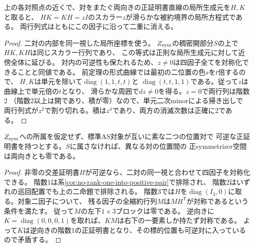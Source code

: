 \begin{corollary}[二対二境界の局所方程式]\label{cor:two-pair-transverse-coordinate}
上の各対照点の近くで、対をまたぐ両向きの正証明書直線の局所生成元を$H,K$と取ると、
$HK=KH=zI$のスカラー$z$が滑らかな被約境界の局所方程式である。
両行列式はともにこの因子に沿って二重に消える。
\end{corollary}
\begin{proof}
二対の内部を同一視した局所座標を使う。
$Z_{\rm sym}$の稠密開部分$S$の上で$HK,KH$は同じスカラー行列であり、
この等式は正則な局所生成元に対して近傍全体に延びる。
対内の可逆性も保たれるため、$z\ne0$は四因子全てを対称化できることと同値である。
前定理の形式曲線では最初の二位置の色$s$を$t$倍するので、
$H,K$は単元を除いて$\operatorname{diag}(1,1,t,t)$と
$\operatorname{diag}(t,t,1,1)$である。従って$z$は曲線上で単元倍の$t$となり、
滑らかな周囲で$dz\ne0$を得る。$z=0$で両行列は階数2
（階数2以上は開であり、積が零）なので、単元二次minorによる掃き出しで
両行列式が$z^2$で割り切れる。積は$z^4$であり、両方の消滅次数は正確に2である。
\end{proof}

\begin{corollary}[二対を持つAS点の交差証明書空間]\label{cor:two-pair-cross-space-zero}
$Z_{\rm sym}$への所属を仮定せず、標準AS対象が互いに素な二つの位置対で
可逆な正証明書を持つとする。$S$に属さなければ、異なる対の位置間の
正symmetrizer空間は両向きとも零である。
\end{corollary}
\begin{proof}
非零の交差証明書$H$が可逆なら、二対の同一視と合わせて四因子を対称化できる。
階数1は系\ref{cor:no-rank-one-into-positive-pair}で排除され、
階数2はいずれの巡回配置でも上の二命題で排除される。
階数3では$H$を$\operatorname{diag}(I_3,0)$に取る。対象二因子について、
残る因子の全縮約行列$M$は$MH^{\mathsf T}$が対称であるという条件を満たす。
従って$M$の左下$1\times3$ブロックは零である。
逆向きに$K=\operatorname{diag}(0,0,0,1)$を取れば、$KM$は右下の一要素しか持たず対称である。
よって$K$は逆向きの階数1の正証明書となり、その標的位置も可逆対に入っているので矛盾する。
\end{proof}
